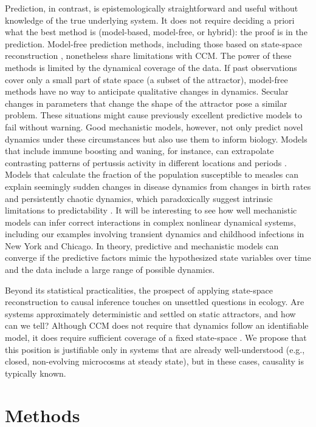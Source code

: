 \documentclass[10pt,letterpaper]{article}
\begin{document}
Prediction, in contrast, is epistemologically straightforward and useful without knowledge of the true underlying system. 
It does not require deciding a priori what the best method is (model-based, model-free, or hybrid): the proof is in the prediction.
Model-free prediction methods, including those based on state-space reconstruction \cite{Ye2015eqn, Deyle2016a, Deyle2016b}, nonetheless share limitations with CCM.
The power of these methods is limited by the dynamical coverage of the data.
If past observations cover only a small part of state space (a subset of the attractor), model-free methods have no way to anticipate qualitative changes in dynamics.
Secular changes in parameters that change the shape of the attractor pose a similar problem.
These situations might cause previously excellent predictive models to fail without warning.
Good mechanistic models, however, not only predict novel dynamics under these circumstances but also use them to inform biology.
Models that include immune boosting and waning, for instance, can extrapolate contrasting patterns of pertussis activity in different locations and periods \cite{DomenechdeCells2016,Lavine2013}. 
Models that calculate the fraction of the population susceptible to measles can explain seemingly sudden changes in disease dynamics from changes in birth rates \cite{Finkenstadt2000} and persistently chaotic dynamics, which paradoxically suggest intrinsic limitations to predictability \cite{Dalziel2016}.
It will be interesting to see how well mechanistic models can infer correct interactions in complex nonlinear dynamical systems, including our examples involving transient dynamics and childhood infections in New York and Chicago.
In theory, predictive and mechanistic models can converge if the predictive factors mimic the hypothesized state variables over time  and the data include a large range of possible dynamics.

Beyond its statistical practicalities, the prospect of applying state-space reconstruction to causal inference touches on unsettled questions in ecology.
Are systems approximately deterministic and settled on static attractors, and how can we tell?
Although CCM does not require that dynamics follow an identifiable model, it does require sufficient coverage of a fixed state-space \cite{Hastings2004}.
We propose that this position is justifiable only in systems that are already well-understood (e.g., closed, non-evolving microcosms at steady state), but in these cases, causality is typically known.

\section*{Methods}
\end{document}
